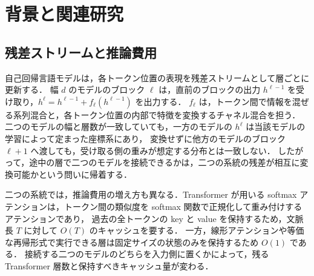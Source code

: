 \documentclass[techrep,noauthor]{ipsj}
\newcommand{\rev}[1]{{\color{blue}#1}}
\newcommand{\revr}[1]{{\color{red}#1}}
\begin{document}
\section{背景と関連研究}\label{sec:related}
\subsection{\rev{残差ストリームと推論費用}}
\revr{自己回帰言語モデルは，各トークン位置の表現を残差ストリームとして層ごとに更新する．
幅 $d$ のモデルのブロック $\ell$ は，直前のブロックの出力 $h^{\ell-1}$ を受け取り，$h^{\ell}=h^{\ell-1}+f_\ell(h^{\ell-1})$ を出力する．
$f_\ell$ は，トークン間で情報を混ぜる系列混合と，各トークン位置の内部で特徴を変換するチャネル混合を担う．
二つのモデルの幅と層数が一致していても，一方のモデルの $h^{\ell}$ は当該モデルの学習によって定まった座標系にあり，
変換せずに他方のモデルのブロック $\ell{+}1$ へ渡しても，受け取る側の重みが想定する分布とは一致しない．
したがって，途中の層で二つのモデルを接続できるかは，二つの系統の残差が相互に変換可能かという問いに帰着する．}

\revr{二つの系統では，推論費用の増え方も異なる．Transformer が用いる softmax アテンションは，トークン間の類似度を softmax 関数で正規化して重み付けするアテンションであり，
過去の全トークンの key と value を保持するため，文脈長 $T$ に対して $O(T)$ のキャッシュを要する．
一方，線形アテンションや等価な再帰形式で実行できる層は固定サイズの状態のみを保持するため $O(1)$ である．
接続する二つのモデルのどちらを入力側に置くかによって，残る Transformer 層数と保持すべきキャッシュ量が変わる．}
\end{document}
